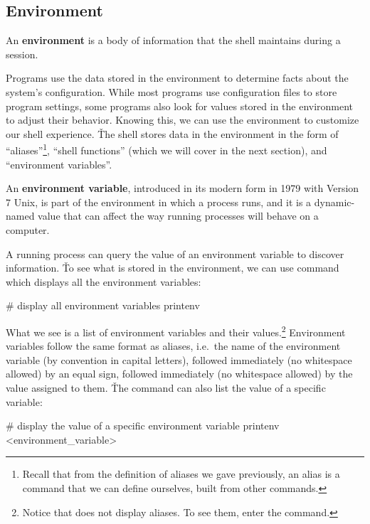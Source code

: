\subsection{Environment}

\bd[Environment]
An \textbf{environment} is a body of information that the shell maintains during a session.
\ed

Programs use the data stored in the environment to determine facts about the system's configuration. While most
programs use configuration files to store program settings, some programs also look for values stored in the
environment to adjust their behavior. Knowing this, we can use the environment to customize our shell experience. \v

The shell stores data in the environment in the form of ``aliases''\footnote{Recall that from the definition of
aliases we gave previously, an alias is a command that we can define ourselves, built from other commands.}, ``shell
functions'' (which we will cover in the next section), and ``environment variables''.

An \textbf{environment variable}, introduced in its modern form in 1979 with Version 7 Unix, is part of the environment
in which a process runs, and it is a dynamic-named value that can affect the way running processes will behave on a
computer.
\ed

A running process can query the value of an environment variable to discover information. \v

To see what is stored in the environment, we can use  command which displays all the environment
variables:
\begin{bash}
# display all environment variables
printenv
\end{bash}

What we see is a list of environment variables and their values.\footnote{Notice that  does not
display aliases. To see them, enter the  command.} Environment variables follow the same format as
aliases, i.e.\ the name of the environment variable (by convention in capital letters), followed immediately (no
whitespace allowed) by an equal sign, followed immediately (no whitespace allowed) by the value assigned to them. \v

The  command can also list the value of a specific variable:
\begin{bash}
# display the value of a specific environment variable
printenv <environment_variable>
\end{bash}

